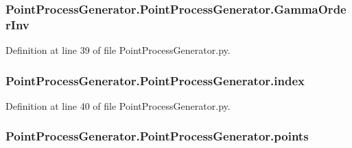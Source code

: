 \hypertarget{class_point_process_generator_1_1_point_process_generator_aa70be756b1535ff4512affa05a732fda}{
\subsubsection[{Gamma\-Order\-Inv}]{\setlength{\rightskip}{0pt plus 5cm}Point\-Process\-Generator.\-Point\-Process\-Generator.\-Gamma\-Order\-Inv}}\label{class_point_process_generator_1_1_point_process_generator_aa70be756b1535ff4512affa05a732fda}


Definition at line 39 of file Point\-Process\-Generator.\-py.

\hypertarget{class_point_process_generator_1_1_point_process_generator_a57f6c8af8fd3d37ed8ab2f4abe9be5d8}{
\subsubsection[{index}]{\setlength{\rightskip}{0pt plus 5cm}Point\-Process\-Generator.\-Point\-Process\-Generator.\-index}}\label{class_point_process_generator_1_1_point_process_generator_a57f6c8af8fd3d37ed8ab2f4abe9be5d8}


Definition at line 40 of file Point\-Process\-Generator.\-py.

\hypertarget{class_point_process_generator_1_1_point_process_generator_ab36d31f34c0330e13ae9732d53984bab}{
\subsubsection[{points}]{\setlength{\rightskip}{0pt plus 5cm}Point\-Process\-Generator.\-Point\-Process\-Generator.\-points}}\label{class_point_process_generator_1_1_point_process_generator_ab36d31f34c0330e13ae9732d53984bab}



